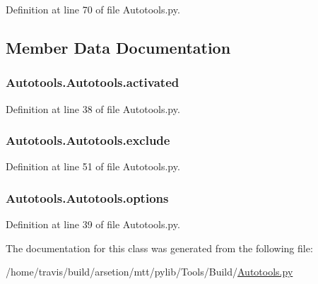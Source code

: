 Definition at line 70 of file Autotools.\-py.



\subsection{Member Data Documentation}
\hypertarget{classAutotools_1_1Autotools_a6bbb714a91bc8b6fe749326772b073b3}{
\subsubsection[{activated}]{\setlength{\rightskip}{0pt plus 5cm}Autotools.\-Autotools.\-activated}}\label{classAutotools_1_1Autotools_a6bbb714a91bc8b6fe749326772b073b3}


Definition at line 38 of file Autotools.\-py.

\hypertarget{classAutotools_1_1Autotools_aee37d9789ea22ee310ebc357cd721b7f}{
\subsubsection[{exclude}]{\setlength{\rightskip}{0pt plus 5cm}Autotools.\-Autotools.\-exclude}}\label{classAutotools_1_1Autotools_aee37d9789ea22ee310ebc357cd721b7f}


Definition at line 51 of file Autotools.\-py.

\hypertarget{classAutotools_1_1Autotools_a8b348e19f0a7104bde9c43c3a6ed695d}{
\subsubsection[{options}]{\setlength{\rightskip}{0pt plus 5cm}Autotools.\-Autotools.\-options}}\label{classAutotools_1_1Autotools_a8b348e19f0a7104bde9c43c3a6ed695d}


Definition at line 39 of file Autotools.\-py.



The documentation for this class was generated from the following file\-:\begin{DoxyCompactItemize}
\item 
/home/travis/build/arsetion/mtt/pylib/\-Tools/\-Build/\hyperlink{Autotools_8py}{Autotools.\-py}\end{DoxyCompactItemize}
